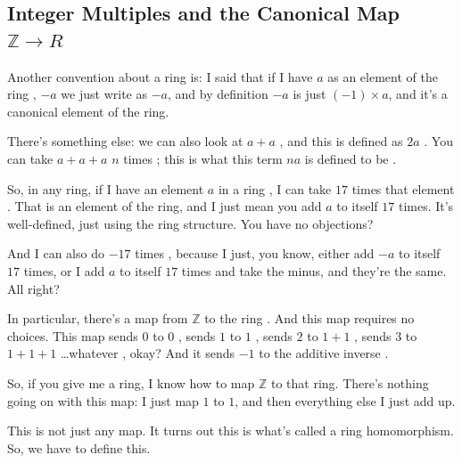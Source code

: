 \subsection{Integer Multiples and the Canonical Map \texorpdfstring{$\mathbb{Z} \to R$}{Z -> R}}

\begin{speech}[00:15:05 - 00:17:10]
Another convention about a ring is: I said that if I have $a$ as an element of the ring , $-a$  we just write as $-a$, and by definition $-a$ is just $(-1) \times a$, and it's a canonical element of the ring.

There's something else: we can also look at $a + a$ , and this is defined as $2a$ . You can take $a + a + a$  $n$ times ; this is what this term $na$ is defined to be .

So, in any ring, if I have an element $a$ in a ring , I can take $17$ times that element . That is an element of the ring, and I just mean you add $a$ to itself $17$ times. It's well-defined, just using the ring structure. You have no objections?

And I can also do $-17$ times , because I just, you know, either add $-a$ to itself $17$ times, or I add $a$ to itself $17$ times and take the minus, and they're the same. All right?

In particular, there's a map from $\mathbb{Z}$ to the ring . And this map requires no choices. This map sends $0$ to $0$ , sends $1$ to $1$ , sends $2$ to $1 + 1$ , sends $3$ to $1 + 1 + 1$ \dots whatever , okay? And it sends $-1$ to the additive inverse .

So, if you give me a ring, I know how to map $\mathbb{Z}$ to that ring. There's nothing going on with this map: I just map $1$ to $1$, and then everything else I just add up.

This is not just any map. It turns out this is what's called a ring homomorphism. So, we have to define this.
\end{speech}

